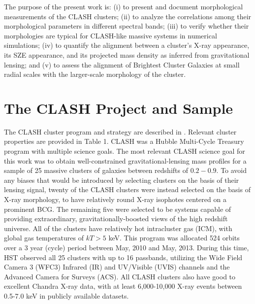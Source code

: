 \documentclass[iop,twocolumn]{emulateapj}
\begin{document}
{The purpose of the present work is: 
(i) to present and document morphological measurements of the CLASH clusters; 
(ii) to analyze the correlations among their morphological parameters in different spectral bands;  
(iii) to verify whether their morphologies are typical for CLASH-like massive systems in numerical simulations;  
(iv) to quantify the alignment between a cluster's X-ray appearance, its SZE appearance, and its projected mass density as inferred from gravitational lensing; 
and (v) to assess the alignment of Brightest Cluster Galaxies at small radial scales with the larger-scale morphology of the cluster.  
 
\section{The CLASH Project and Sample}

The CLASH cluster program and strategy are described in \citet{2012ApJS..199...25P}. 
Relevant cluster properties are provided in Table 1. 
CLASH was a Hubble Multi-Cycle Treasury program with multiple science goals. 
The most relevant CLASH science goal for this work was to obtain well-constrained gravitational-lensing mass profiles for a sample of 25 massive clusters of galaxies between redshifts of $0.2-0.9$. 
To avoid any biases that would be introduced by selecting clusters on the basis of their lensing signal, twenty of the CLASH clusters were instead selected on the basis of X-ray morphology, to have relatively round X-ray isophotes centered on a prominent BCG.  
The remaining five were selected to be systems capable of providing extraordinary, gravitationally-boosted views of the high redshift universe. 
All of the clusters  have relatively hot intracluster gas (ICM), with global gas temperatures of $kT > 5$ keV. 
This program was allocated 524 orbits over a 3 year (cycle) period between May, 2010 and May, 2013. 
During this time, HST observed all 25 clusters with up to 16 passbands, utilizing the Wide Field Camera 3 (WFC3) Infrared (IR) and UV/Visible (UVIS) channels and the Advanced Camera for Surveys (ACS).  
All CLASH clusters also have good to excellent Chandra X-ray data, with at least 6,000-10,000 X-ray events between 0.5-7.0 keV in publicly available datasets. 

}
\end{document}
